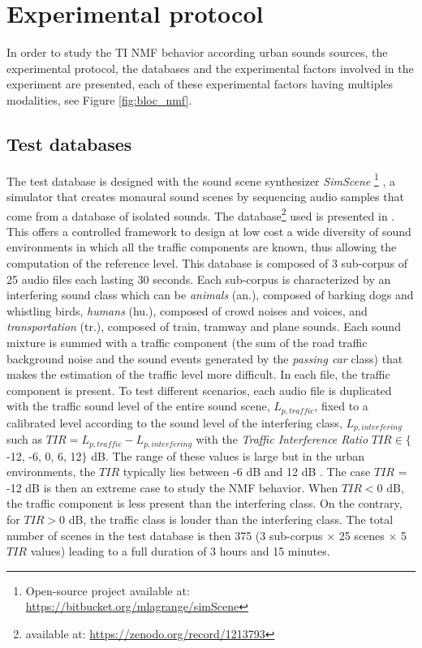 \documentclass[12pt,english,twoside]{article}
\begin{document}
\section{Experimental protocol}\label{part:protocol}

In order to study the TI NMF behavior according urban sounds sources, the experimental protocol, the databases and the experimental factors involved in the experiment are presented, each of these experimental factors having multiples modalities, see Figure \ref{fig:bloc_nmf}.

\subsection{Test databases}\label{part:test_datase}

The test database is designed with the sound scene synthesizer \textit{SimScene} \footnote{Open-source project available at: \url{https://bitbucket.org/mlagrange/simScene}} \cite{rossignol_simscene_2015}, a simulator that creates monaural sound scenes by sequencing audio samples that come from a database of isolated sounds\cite{lagrange2015evaluation}.
The database\footnote{available at: \url{https://zenodo.org/record/1213793}} used is presented in \cite{gloaguen2017creation}. This offers a controlled framework to design at low cost a wide diversity of sound environments in which all the traffic components are known, thus allowing the computation of the reference level.
This database is composed of 3 sub-corpus of 25 audio files each lasting 30 seconds. Each sub-corpus is characterized by an interfering sound class which can be \textit{animals} (an.), composed of barking dogs and whistling birds, \textit{humans} (hu.), composed of crowd noises and voices, and \textit{transportation} (tr.), composed of train, tramway and plane sounds. Each sound mixture is summed  with a traffic component (the sum of the road traffic background noise and the sound events generated by the \textit{passing car} class) that makes the estimation of the traffic level more difficult. In each file, the traffic component is present. To test different scenarios, each audio file is duplicated with the traffic sound level of the entire sound scene, $L_{p,traffic}$, fixed to a calibrated level according to the sound level of the interfering class, $L_{p,interfering}$ such as $
TIR = L_{p,traffic}-L_{p,interfering}$ with the \textit{Traffic Interference Ratio} $TIR \in \lbrace$-12, -6, 0, 6, 12$\rbrace$ dB.
The range of these values is large but in the urban environments, the $TIR$ typically lies between -6 dB and 12 dB \cite{gloaguen2017creation}. The case $TIR$ = -12 dB is then an extreme case to study the NMF behavior. When $TIR < 0$ dB, the traffic component is less present than the interfering class. On the contrary, for $TIR > 0$ dB, the traffic class is louder than the interfering class. The total number of scenes in the test database is then 375 (3 sub-corpus $\times$ 25 scenes $\times$  5 $TIR$ values) leading to a full duration of 3 hours and 15 minutes.
\end{document}
